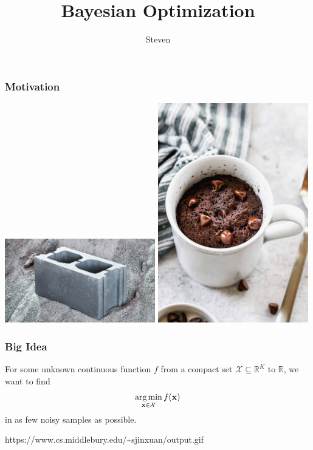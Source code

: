 \documentclass{beamer}
\title{Bayesian Optimization}
\author{Steven}
\begin{document}
\begin{frame}
    \titlepage
\end{frame}

\begin{frame}
    \frametitle{Motivation}
    \includegraphics[width=0.49\textwidth]{fig/carbon-neutral-concrete-feature_dezeen_2364_col_1.jpg}
    \includegraphics[width=0.49\textwidth]{fig/Chocolate-Mug-Cake-1.jpg}
\end{frame}

\begin{frame}
    \frametitle{Big Idea}
    For some unknown continuous function $f$ from a compact set $\mathcal{X} \subseteq \mathbb{R}^{K}$ to $\mathbb{R}$, we want to find
    \begin{equation*}
        \operatorname*{arg\,min}_{\mathbf{x} \in \mathcal{X}} f(\mathbf{x})
    \end{equation*}
    in as few noisy samples as possible.
\end{frame}

\begin{frame}
    \begin{centering}
        https://www.cs.middlebury.edu/\textasciitilde sjinxuan/output.gif
    \end{centering}
\end{frame}
\end{document}
